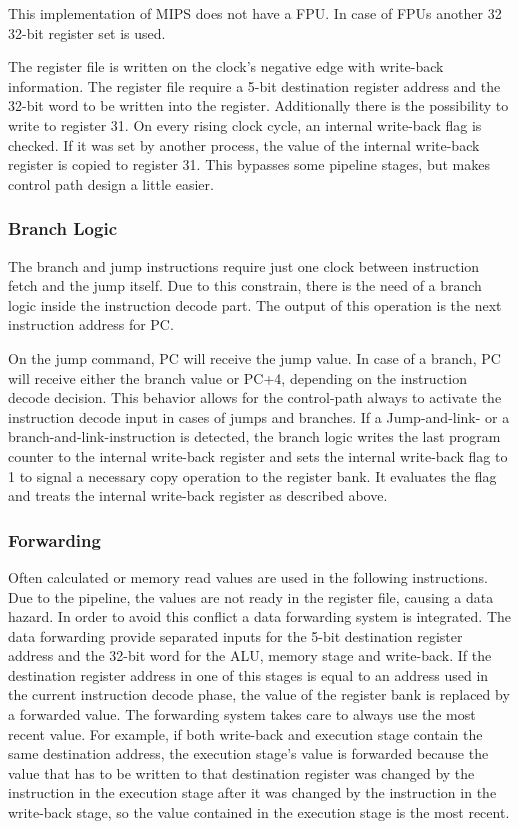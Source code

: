 This implementation of MIPS does not have a FPU. In case of FPUs another 32 32-bit register set is used.

The register file is written on the clock's negative edge with write-back information. The register file require a 5-bit destination register address and the 32-bit word to be written into the register. 
Additionally there is the possibility to write to register 31. On every rising clock cycle, an internal write-back flag is checked. If it was set by another process, 
the value of the internal write-back register is copied to register 31. This bypasses some pipeline stages, but makes control path design a little easier.
\subsubsection{Branch Logic}
The branch and jump instructions require just one clock between instruction fetch and the jump itself. Due to this constrain, there is the need of a branch logic inside
the instruction decode part. The output of this operation is the next instruction address for PC. 

On the jump command, PC will receive the jump value. 
In case of a branch, PC will receive either the branch value or PC+4, depending on the instruction decode decision. This behavior allows for the control-path always to 
activate the instruction decode input in cases of jumps and branches. If a Jump-and-link- or a branch-and-link-instruction is detected, the branch logic writes the last 
program counter to the internal write-back register and sets the internal write-back flag to 1 to signal a necessary copy operation to the register bank. 
It evaluates the flag and treats the internal write-back register as described above.
\subsubsection{Forwarding}
Often calculated or memory read values are used in the following instructions. Due to the pipeline, the values are not ready in the register file, causing a data hazard. In order to avoid this conflict
a data forwarding system is integrated. The data forwarding provide separated inputs for the 5-bit destination register address and the 32-bit word for the ALU, memory stage and write-back. 
If the destination register address in one of this stages is equal to an address used in the current instruction decode phase, the value of the register bank is replaced by a forwarded value. 
The forwarding system takes care to always use the most recent value. For example, if both write-back and execution stage contain the same destination address, 
the execution stage's value is forwarded because the value that has to be written to that destination register was changed by the instruction in the execution stage after 
it was changed by the instruction in the write-back stage, so the value contained in the execution stage is the most recent.


